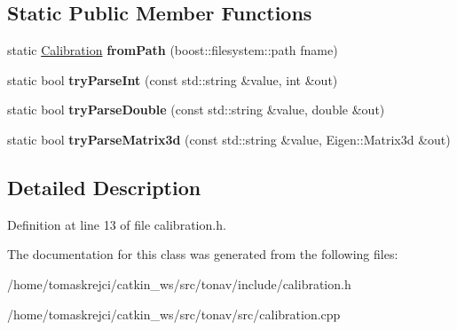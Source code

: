 \subsection*{Static Public Member Functions}
\begin{DoxyCompactItemize}
\item 
\hypertarget{class_calibration_a407d16502f36acfc7bd00572abe90739}{static \hyperlink{class_calibration}{Calibration} {\bfseries from\-Path} (boost\-::filesystem\-::path fname)}\label{class_calibration_a407d16502f36acfc7bd00572abe90739}

\item 
\hypertarget{class_calibration_a1d1c3b1b92ae75db9428f61b7afcc7f0}{static bool {\bfseries try\-Parse\-Int} (const std\-::string \&value, int \&out)}\label{class_calibration_a1d1c3b1b92ae75db9428f61b7afcc7f0}

\item 
\hypertarget{class_calibration_a043fc49ab017f6188dfb1b38cf7b573e}{static bool {\bfseries try\-Parse\-Double} (const std\-::string \&value, double \&out)}\label{class_calibration_a043fc49ab017f6188dfb1b38cf7b573e}

\item 
\hypertarget{class_calibration_a58c12342c94ea075107e6202e67c714a}{static bool {\bfseries try\-Parse\-Matrix3d} (const std\-::string \&value, Eigen\-::\-Matrix3d \&out)}\label{class_calibration_a58c12342c94ea075107e6202e67c714a}

\end{DoxyCompactItemize}


\subsection{Detailed Description}


Definition at line 13 of file calibration.\-h.



The documentation for this class was generated from the following files\-:\begin{DoxyCompactItemize}
\item 
/home/tomaskrejci/catkin\-\_\-ws/src/tonav/include/calibration.\-h\item 
/home/tomaskrejci/catkin\-\_\-ws/src/tonav/src/calibration.\-cpp\end{DoxyCompactItemize}
